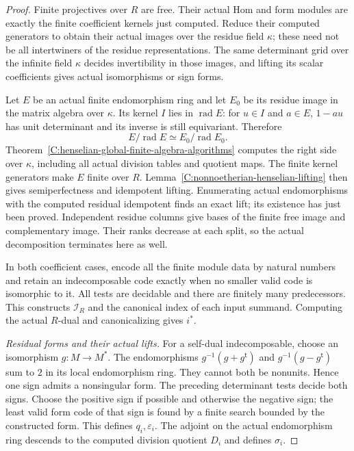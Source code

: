 \begin{proof}
Finite projectives over $R$
are free.  Their actual Hom
and form modules are exactly
the finite coefficient kernels
just computed.  Reduce their
computed generators to obtain
their actual images over the
residue field $\kappa$; these
need not be all intertwiners
of the residue representations.
The same determinant grid over
the infinite field $\kappa$
decides invertibility in those
images, and lifting its scalar
coefficients gives actual
isomorphisms or sign forms.

Let $E$ be an actual finite
endomorphism ring and let $E_0$
be its residue image in the
matrix algebra over $\kappa$.
Its kernel $I$ lies in
$\operatorname{rad}E$: for
$u\in I$ and $a\in E$,
$1-au$ has unit determinant
and its inverse is still
equivariant.  Therefore
\[
 E/\operatorname{rad}E
            \simeq E_0/\operatorname{rad}E_0.          \tag{C.3.HW4}
\]
Theorem~\ref{C:henselian-global-finite-algebra-algorithms}
computes the right side over
$\kappa$, including all actual
division tables and quotient maps.
The finite kernel generators
make $E$ finite over $R$.
Lemma~\ref{C:nonnoetherian-henselian-lifting}
then gives semiperfectness and
idempotent lifting.  Enumerating
actual endomorphisms with the
computed residual idempotent
finds an exact lift; its
existence has just been proved.
Independent residue columns
give bases of the finite free
image and complementary image.
Their ranks decrease at each
split, so the actual decomposition
terminates here as well.

In both coefficient cases, encode
all the finite module data by
natural numbers and retain an
indecomposable code exactly when
no smaller valid code is isomorphic
to it.  All tests are decidable
and there are finitely many
predecessors.  This constructs
$\mathscr I_R$ and the canonical
index of each input summand.
Computing the actual $R$-dual
and canonicalizing gives $i^*$.

\emph{Residual forms and their actual lifts.}
For a self-dual indecomposable,
choose an isomorphism $g:M\to M^*$.
The endomorphisms
$g^{-1}(g+g^{\mathsf t})$ and
$g^{-1}(g-g^{\mathsf t})$ sum
to $2$ in its local endomorphism
ring.  They cannot both be
nonunits.  Hence one sign
admits a nonsingular form.
The preceding determinant
tests decide both signs.
Choose the positive sign if
possible and otherwise the
negative sign; the least
valid form code of that sign
is found by a finite search
bounded by the constructed
form.  This defines
$q_i,\varepsilon_i$.
The adjoint on the actual
endomorphism ring descends to
the computed division quotient
$D_i$ and defines $\sigma_i$.


\end{proof}
